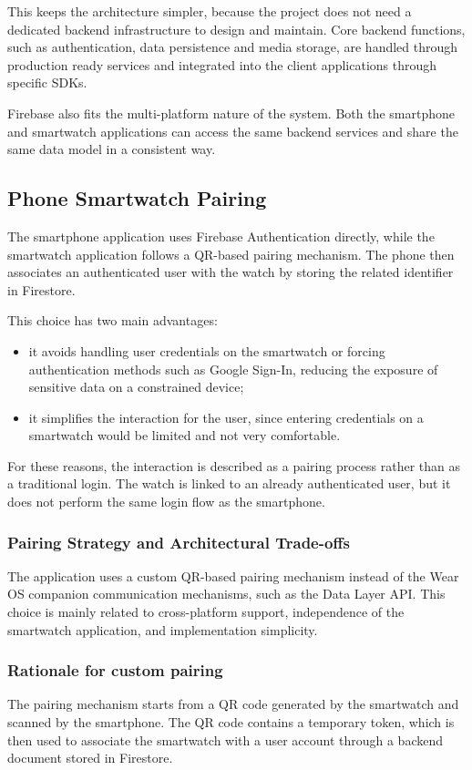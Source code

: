 This keeps the architecture simpler, because the project does not need a dedicated backend infrastructure to design and maintain. Core backend functions, such as authentication, data persistence and media storage, are handled through production ready services and integrated into the client applications through specific SDKs.

Firebase also fits the multi-platform nature of the system. Both the smartphone and smartwatch applications can access the same backend services and share the same data model in a consistent way.
\newpage



\subsection{Phone Smartwatch Pairing} \label{Phone Smartwatch Pairing}
The smartphone application uses Firebase Authentication directly, while the smartwatch application follows a QR-based pairing mechanism. The phone then associates an authenticated user with the watch by storing the related identifier in Firestore. \

This choice has two main advantages:
\begin{itemize}
\item it avoids handling user credentials on the smartwatch or forcing authentication methods such as Google Sign-In, reducing the exposure of sensitive data on a constrained device;
\item it simplifies the interaction for the user, since entering credentials on a smartwatch would be limited and not very comfortable.
\end{itemize}

For these reasons, the interaction is described as a pairing process rather than as a traditional login. The watch is linked to an already authenticated user, but it does not perform the same login flow as the smartphone. \

\subsubsection{Pairing Strategy and Architectural Trade-offs}
The application uses a custom QR-based pairing mechanism instead of the Wear OS companion communication mechanisms, such as the Data Layer API. This choice is mainly related to cross-platform support, independence of the smartwatch application, and implementation simplicity.

\subsubsection{Rationale for custom pairing}
The pairing mechanism starts from a QR code generated by the smartwatch and scanned by the smartphone. The QR code contains a temporary token, which is then used to associate the smartwatch with a user account through a backend document stored in Firestore.

